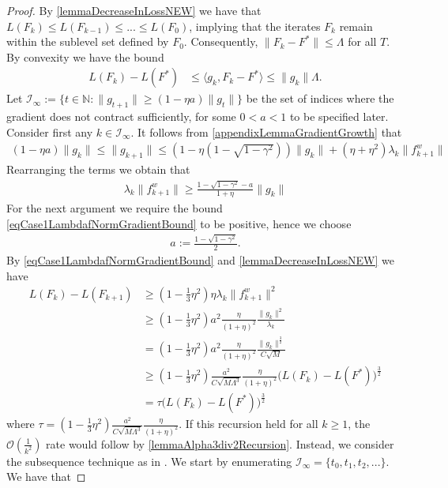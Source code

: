 \documentclass{article}
\theoremstyle{plain}
\theoremstyle{definition}
\theoremstyle{remark}
\begin{document}
\begin{proof}
    By \cref{lemmaDecreaseInLossNEW} we have that $L(F_k) \leq L(F_{k-1}) \leq ... \leq L(F_0)$, implying that the iterates $F_k$ remain within the sublevel set defined by $F_0$. Consequently, $\|F_k-F^*\| \leq \Lambda$ for all $T$. By convexity we have the bound
    \begin{align}
        L(F_k) - L(F^*)
        &\leq \langle g_k, F_k-F^*\rangle  \leq \|g_k\| \Lambda.
    \end{align}
    Let $\mathcal{I}_\infty := \{ t\in \mathbb{N} : \|g_{t+1}\|\geq (1-\eta a) \|g_t\| \}$ be the set of indices where the gradient does not contract sufficiently, for some $0<a<1$ to be specified later. Consider first any $k\in \mathcal{I}_\infty$. It follows from \cref{appendixLemmaGradientGrowth} that
    \begin{align}
        (1-\eta a) \|g_k\| \leq \|g_{k+1}\| \leq  \left(1-\eta(1-\sqrt{1-\gamma^2})\right)\|g_k\| + (\eta+\eta^2)\lambda_k \|f_{k+1}^w\|
    \end{align}
    Rearranging the terms we obtain that
    \begin{align}\label{eqCase1LambdafNormGradientBound}
        \lambda_k \|f_{k+1}^w\| \geq \frac{1 - \sqrt{1-\gamma^2} - a}{1+\eta} \|g_k\|
    \end{align}
    For the next argument we require the bound \eqref{eqCase1LambdafNormGradientBound} to be positive, hence we choose 
    \begin{align}
        a := \frac{1-\sqrt{1-\gamma^2}}{2}.
    \end{align}
    By \eqref{eqCase1LambdafNormGradientBound} and \cref{lemmaDecreaseInLossNEW} we have
    \begin{align}
        L(F_k) - L(F_{k+1})
        &\geq \left( 1 - \frac{1}{3}\eta^2 \right) \eta  \lambda_k \|f_{k+1}^w\|^2 \\
        &\geq \left( 1 - \frac{1}{3}\eta^2 \right) a^2 \frac{\eta}{(1+\eta)^2} \frac{\|g_k\|^2}{\lambda_k} \\
        &= \left( 1 - \frac{1}{3}\eta^2 \right) a^2  \frac{\eta}{(1+\eta)^2} \frac{\|g_k\|^\frac{3}{2}}{C\sqrt{M}} \\
        &\geq \left( 1 - \frac{1}{3}\eta^2 \right) \frac{a^2 }{C\sqrt{M\Lambda^3}} \frac{\eta}{(1+\eta)^2} \bigg(  L(F_k) - L(F^*) \bigg)^\frac{3}{2} \\
        &= \tau \bigg(  L(F_k) - L(F^*) \bigg)^\frac{3}{2}
    \end{align}
    where $\tau = \left( 1 - \frac{1}{3}\eta^2 \right) \frac{a^2 }{C\sqrt{M\Lambda^3}} \frac{\eta}{(1+\eta)^2}$. If this recursion held for all $k\geq 1$, the $\mathcal{O}(\frac{1}{k^2})$ rate would follow by \cref{lemmaAlpha3div2Recursion}. Instead, we consider the subsequence technique as in \cite{2023RegularizedNewtonMethodWithGlobalConvergence}. We start by enumerating $\mathcal{I}_\infty = \{t_0, t_1, t_2, ...\}$. We have that

\end{proof}
\end{document}
